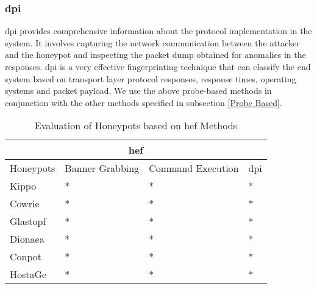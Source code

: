 \subsubsection{\acrfull{dpi}}
\acrshort{dpi} provides comprehensive information about the protocol implementation in the system. It involves capturing the network communication between the attacker and the honeypot and inspecting the packet dump obtained for anomalies in the responses. \acrshort{dpi} is a very effective fingerprinting technique that can classify the end system based on transport layer protocol responses, response times, operating systems and packet payload. We use the above probe-based methods in conjunction with the other methods specified in subsection \ref{Probe Based}.




\begin{table}[]
\begin{tabular}{ |p{1.5cm}||p{1.5cm}|p{1.5cm}|p{1cm}| }
 \hline
 \multicolumn{4}{|c|}{\acrfull{hef}} Techniques \\
 \hline
 Honeypots & Banner Grabbing & Command Execution & \acrshort{dpi} \\
 \hline
 Kippo   & *  &* & * \\
 Cowrie  & *  &* & * \\
 Glastopf& *  &* & *  \\
 Dionaea & *  &* & * \\
 Conpot  & *  &* & * \\
 HostaGe & *  &* & * \\
 \hline
 \end{tabular}
\caption{Evaluation of Honeypots based on \acrshort{hef} Methods}
 \label{Tab:hef}
 \end{table}